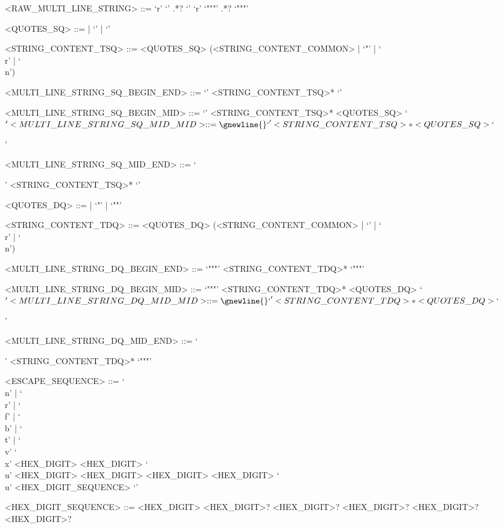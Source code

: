 \documentclass[makeidx]{article}
\begin{document}
{\begin{grammar}
<RAW\_MULTI\_LINE\_STRING> ::= `r' `\sqsqsq' .*? `\sqsqsq'
  \alt `r' `"""' .*? `"""'

<QUOTES\_SQ> ::= | `\sq' | `\sqsq'

<STRING\_CONTENT\_TSQ> ::= \gnewline{}
  <QUOTES\_SQ> (<STRING\_CONTENT\_COMMON> | `"' | `\\r' | `\\n')

<MULTI\_LINE\_STRING\_SQ\_BEGIN\_END> ::= \gnewline{}
  `\sqsqsq' <STRING\_CONTENT\_TSQ>* `\sqsqsq'

<MULTI\_LINE\_STRING\_SQ\_BEGIN\_MID> ::= \gnewline{}
  `\sqsqsq' <STRING\_CONTENT\_TSQ>* <QUOTES\_SQ> `${'

<MULTI\_LINE\_STRING\_SQ\_MID\_MID> ::= \gnewline{}
  `}' <STRING\_CONTENT\_TSQ>* <QUOTES\_SQ> `${'

<MULTI\_LINE\_STRING\_SQ\_MID\_END> ::= \gnewline{}
  `}' <STRING\_CONTENT\_TSQ>* `\sqsqsq'

<QUOTES\_DQ> ::= | `"' | `""'

<STRING\_CONTENT\_TDQ> ::= \gnewline{}
  <QUOTES\_DQ> (<STRING\_CONTENT\_COMMON> | `\sq' | `\\r' | `\\n')

<MULTI\_LINE\_STRING\_DQ\_BEGIN\_END> ::= \gnewline{}
  `"""' <STRING\_CONTENT\_TDQ>* `"""'

<MULTI\_LINE\_STRING\_DQ\_BEGIN\_MID> ::= \gnewline{}
  `"""' <STRING\_CONTENT\_TDQ>* <QUOTES\_DQ> `${'

<MULTI\_LINE\_STRING\_DQ\_MID\_MID> ::= \gnewline{}
  `}' <STRING\_CONTENT\_TDQ>* <QUOTES\_DQ> `${'

<MULTI\_LINE\_STRING\_DQ\_MID\_END> ::= \gnewline{}
  `}' <STRING\_CONTENT\_TDQ>* `"""'

<ESCAPE\_SEQUENCE> ::= `\\n' | `\\r' | `\\f' | `\\b' | `\\t' | `\\v'
  \alt `\\x' <HEX\_DIGIT> <HEX\_DIGIT>
  \alt `\\u' <HEX\_DIGIT> <HEX\_DIGIT> <HEX\_DIGIT> <HEX\_DIGIT>
  \alt `\\u{' <HEX\_DIGIT\_SEQUENCE> `}'

<HEX\_DIGIT\_SEQUENCE> ::= \gnewline{}
  <HEX\_DIGIT> <HEX\_DIGIT>? <HEX\_DIGIT>?
  \gnewline{} <HEX\_DIGIT>? <HEX\_DIGIT>? <HEX\_DIGIT>?
\end{grammar}

}
\end{document}
